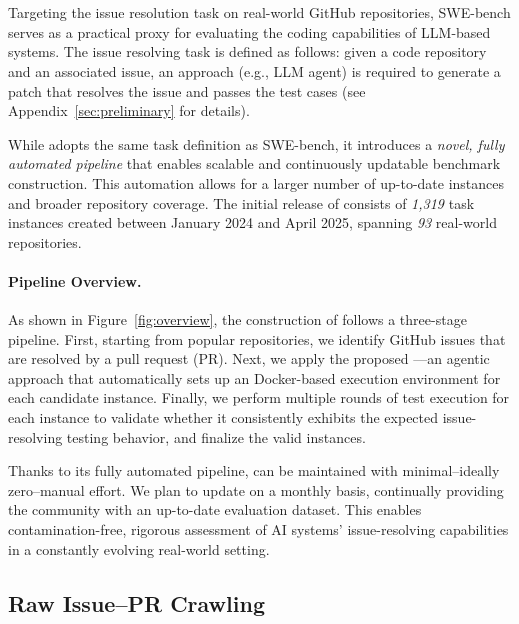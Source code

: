 \section{\benchmark}
\label{sec:method}

Targeting the issue resolution task on real-world GitHub repositories, SWE-bench serves as a practical proxy for evaluating the coding capabilities of LLM-based systems. The issue resolving task is defined as follows: given a code repository and an associated issue, an approach (e.g., LLM agent) is required to generate a patch that resolves the issue and passes the test cases (see Appendix~\ref{sec:preliminary} for details). 

While \benchmark{} adopts the same task definition as SWE-bench, it introduces a \emph{novel, fully automated pipeline} that enables scalable and continuously updatable benchmark construction. This automation allows for a larger number of up-to-date instances and broader repository coverage. The initial release of \benchmark consists of \textit{1,319} task instances created between January 2024 and April 2025, spanning \textit{93} real-world repositories. 

\paragraph{Pipeline Overview.} As shown in Figure~\ref{fig:overview}, the construction of \benchmark{} follows a three-stage pipeline. First, starting from popular repositories, we identify GitHub issues that are resolved by a pull request (PR). Next, we apply the proposed \method{}—an agentic approach that automatically sets up an Docker-based execution environment for each candidate instance. Finally, we perform multiple rounds of test execution for each instance to validate whether it consistently exhibits the expected issue-resolving testing behavior, and finalize the valid instances.

Thanks to its fully automated pipeline, \benchmark{} can be maintained with minimal--ideally zero--manual effort. We plan to update \benchmark{} on a monthly basis, continually providing the community with an up-to-date evaluation dataset. This enables contamination-free, rigorous assessment of AI systems’ issue-resolving capabilities in a constantly evolving real-world setting.


\subsection{Raw Issue–PR Crawling}
\label{sec:crawling}

